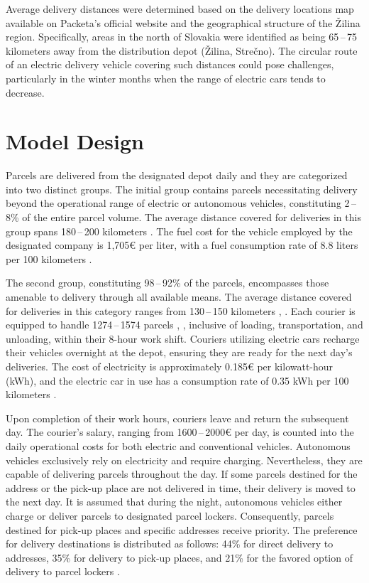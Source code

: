 \documentclass[a4paper, 11pt, a4paper]{article}
\begin{document}
Average delivery distances were determined based on the delivery locations map available on Packeta's official website \cite{packeta} and the geographical
structure of the Žilina region. Specifically, areas in the north of Slovakia were identified as being 65\,--\,75 kilometers away from the
distribution depot (Žilina, Strečno). The circular route of an electric delivery vehicle covering such distances could pose challenges,
particularly in the winter months when the range of electric cars tends to decrease.


\section{Model Design}

Parcels are delivered from the designated depot daily and they are categorized into two distinct groups. The initial group contains parcels
necessitating delivery beyond the operational range of electric or autonomous vehicles, constituting 2\,--\,8\% \cite{packeta} of the entire parcel volume.
The average distance covered for deliveries in this group spans 180\,--\,200 kilometers \cite{packeta}. The fuel cost for the vehicle employed by the designated
company is 1,705€ per liter, with a fuel consumption rate of 8.8 liters per 100 kilometers \cite{peugeot}.

The second group, constituting 98\,--\,92\% \cite{packeta} of the parcels, encompasses those amenable to delivery through all available means. The average distance
covered for deliveries in this category ranges from 130\,--\,150 kilometers \cite{packeta}, \cite{delivery.distance}. Each courier is equipped to handle 1274\,--\,1574 parcels \cite{parcels.num}, \cite{delivery.percentage}, inclusive of loading,
transportation, and unloading, within their 8-hour work shift. Couriers utilizing electric cars recharge their vehicles overnight at the depot, ensuring
they are ready for the next day's deliveries. The cost of electricity is approximately 0.185€ per kilowatt-hour (kWh), and the electric car in use has a
consumption rate of 0.35 kWh per 100 kilometers \cite{peugeot}.

Upon completion of their work hours, couriers leave and return the subsequent day. The courier's salary, ranging from 1600\,--\,2000€ per day, is counted into
the daily operational costs for both electric and conventional vehicles. Autonomous vehicles exclusively rely on electricity and require charging.
Nevertheless, they are capable of delivering parcels throughout the day. If some parcels destined for the address or the pick-up place are not delivered in time, their delivery is moved to the next day.
It is assumed that during the night, autonomous vehicles either
charge or deliver parcels to designated parcel lockers. Consequently, parcels destined for pick-up places and specific addresses receive priority.
The preference for delivery destinations is distributed as follows: 44\% for direct delivery to addresses, 35\% for delivery to pick-up places,
and 21\% for the favored option of delivery to parcel lockers \cite{delivery.percentage}.
\end{document}
